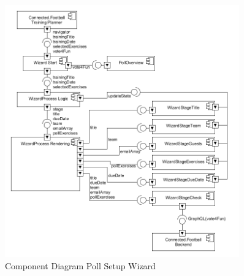 \begin{figure}[H]
    \begin{center}
        \includegraphics[width=0.9\textwidth]{images/diagrams/component_diagrams/ComponentDiagram_Wizard.png}
        \caption{Component Diagram Poll Setup Wizard}
        \label{fig:component_diagram_wizard}
    \end{center}
\end{figure}

